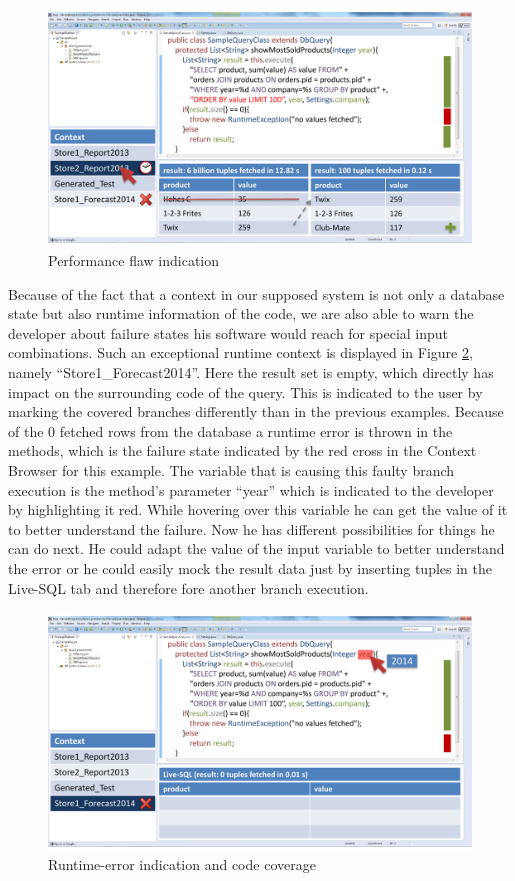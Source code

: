 \begin{figure}
\begin{centering}
    \includegraphics[width=1.0\linewidth]{images/slow}
    \caption{Performance flaw indication}
    \label{fig:final_prototype_slow}
\end{centering}
\end{figure}
Because of the fact that a context in our supposed system is not only a database state but also runtime information of the code, we are also able to warn the developer about failure states his software would reach for special input combinations. Such an exceptional runtime context is displayed in Figure \ref{fig:final_prototype_error}, namely ``Store1\_Forecast2014''. Here the result set is empty, which directly has impact on the surrounding code of the query. This is indicated to the user by marking the covered branches differently than in the previous examples. Because of the 0 fetched rows from the database a runtime error is thrown in the methods, which is the failure state indicated by the red cross in the Context Browser for this example. The variable that is causing this faulty branch execution is the method's parameter ``year'' which is indicated to the developer by highlighting it red. While hovering over this variable he can get the value of it to better understand the failure. Now he has different possibilities for things he can do next. He could adapt the value of the input variable to better understand the error or he could easily mock the result data just by inserting tuples in the Live-SQL tab and therefore fore another branch execution.\\
\begin{figure}
\begin{centering}
    \includegraphics[width=1.0\linewidth]{images/error}
    \caption{Runtime-error indication and code coverage}
    \label{fig:final_prototype_error}
\end{centering}
\end{figure}